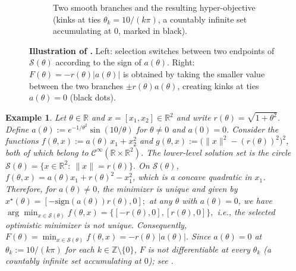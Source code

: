 \documentclass{article}
\theoremstyle{normaltheorem}
\newtheorem{example}[example]{Example}
\newcommand{\R}{\mathbb{R}}
\newcommand{\calS}{\mathcal{S}}
\newcommand{\selectedminimizerset}{{\texttt{O}}}
\begin{document}
\begin{figure}[t]
\begin{subfigure}{0.5\linewidth}
					\caption{Two smooth branches and the resulting hyper-objective (kinks at ties $\theta_k=10/(k\pi)$, a countably infinite set accumulating at $0$, marked in black).}
				\end{subfigure}
			\caption{\textbf{Illustration of .}
			Left: selection switches between two endpoints of $\calS(\theta)$ according to the sign of $a(\theta)$.
		Right: $F(\theta)=-r(\theta)|a(\theta)|$ is obtained by taking the smaller value between the two branches $\pm r(\theta)a(\theta)$, creating kinks at ties $a(\theta)=0$ (black dots).}
		\label{fig:ex-kink}
	\end{figure}
\begin{example}\label{ex:kink}
Let $\theta\in\R$ and $x=[x_1,x_2]\in\R^2$ and write $r(\theta)=\sqrt{1+\theta^2}$.
Define $a(\theta):= e^{-1/\theta^2}\!\sin(10/\theta)$ for $\theta \neq 0$ and $a(0) = 0$.
Consider the functions $f(\theta,x):=a(\theta)\,x_1 + x_2^2$ and $g(\theta,x):=\big(\|x\|^2-(r(\theta))^2\big)^2$, both of which belong to $\mathcal C^\infty(\R \times \R^2)$.
The lower-level solution set is the circle
\(
\calS(\theta)=\{x\in\R^2:\ \|x\|=r(\theta)\}.
\)
On $\calS(\theta)$,
$f(\theta,x)=a(\theta) x_1+r(\theta)^2-x_1^2$, which is a concave quadratic in $x_1$. Therefore, for $a(\theta)\neq 0$, the minimizer is unique and given by
\(
x^\star(\theta)= [ - \mathrm{sign}(a(\theta)) r(\theta), 0 ];
\)
at any $\theta$ with $a(\theta)=0$, we have
\(
\arg\min_{x\in\calS(\theta)} f(\theta,x)=\{[-r(\theta),0],[r(\theta),0]\},
\) i.e., the selected optimistic minimizer is \emph{not unique}. Consequently, $F(\theta)=\min_{x\in\calS(\theta)} f(\theta,x)=-r(\theta)\,|a(\theta)|$. Since $a(\theta)=0$ at $\theta_k:=10/(k\pi)$ for each $k\in\mathbb{Z}\setminus\{0\}$, $F$ is not differentiable at every $\theta_k$ (a countably infinite set accumulating at $0$); see .
\end{example}


\end{document}
